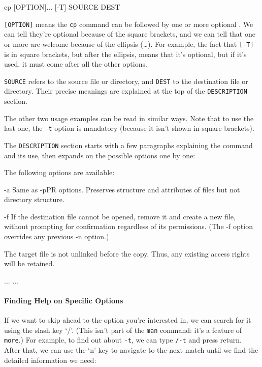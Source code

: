 \documentclass{book}
\begin{document}
\begin{VerbOut}
cp [OPTION]... [-T] SOURCE DEST
\end{VerbOut}

\texttt{{[}OPTION{]}} means the \texttt{cp} command can be followed by
one or more optional . We can tell
they're optional because of the square brackets, and we can tell that
one or more are welcome because of the ellipsis (\ldots{}). For example,
the fact that \texttt{{[}-T{]}} is in square brackets, but after the
ellipsis, means that it's optional, but if it's used, it must come after
all the other options.

\texttt{SOURCE} refers to the source file or directory, and
\texttt{DEST} to the destination file or directory. Their precise
meanings are explained at the top of the \texttt{DESCRIPTION} section.

The other two usage examples can be read in similar ways. Note that to
use the last one, the \texttt{-t} option is mandatory (because it isn't
shown in square brackets).

The \texttt{DESCRIPTION} section starts with a few paragraphs explaining
the command and its use, then expands on the possible options one by
one:

\begin{VerbOut}
     The following options are available:

     -a    Same as -pPR options. Preserves structure and attributes of
           files but not directory structure.

     -f    If the destination file cannot be opened, remove it and create
           a new file, without prompting for confirmation regardless of
           its permissions.  (The -f option overrides any previous -n
           option.)

           The target file is not unlinked before the copy.  Thus, any
           existing access rights will be retained.

      ...  ...
\end{VerbOut}

\mbox{}\paragraph{Finding Help on Specific Options}

If we want to skip ahead to the option you're interested in, we can
search for it using the slash key `/'. (This isn't part of the
\texttt{man} command: it's a feature of \texttt{more}.) For example, to
find out about \texttt{-t}, we can type \texttt{/-t} and press return.
After that, we can use the `n' key to navigate to the next match until
we find the detailed information we need:
\end{document}
